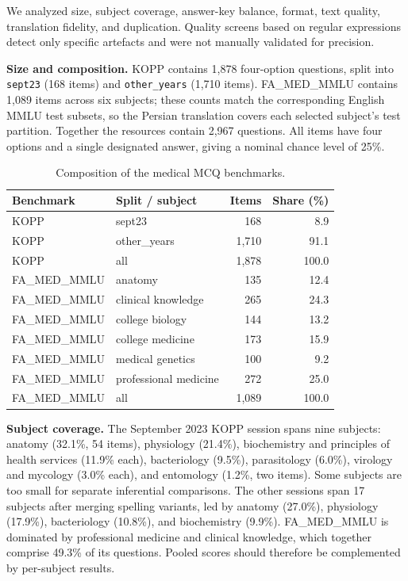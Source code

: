 \documentclass[manuscript,screen,review]{acmart}
\begin{document}
We analyzed size, subject coverage, answer-key balance, format, text quality, translation fidelity, and duplication. Quality screens based on regular expressions detect only specific artefacts and were not manually validated for precision.

\textbf{Size and composition.} KOPP contains 1,878 four-option questions, split into \texttt{sept23} (168 items) and \texttt{other\_years} (1,710 items). FA\_MED\_MMLU contains 1,089 items across six subjects; these counts match the corresponding English MMLU test subsets, so the Persian translation covers each selected subject's test partition. Together the resources contain 2,967 questions. All items have four options and a single designated answer, giving a nominal chance level of 25\%.

\begin{table}[ht]
\caption{Composition of the medical MCQ benchmarks.}\label{tab:mcq_composition}
\small
\begin{tabular}{@{}llrr@{}}
\toprule
Benchmark & Split / subject & Items & Share (\%) \\
\midrule
KOPP & sept23 & 168 & 8.9 \\
KOPP & other\_years & 1,710 & 91.1 \\
KOPP & all & 1,878 & 100.0 \\
\midrule
FA\_MED\_MMLU & anatomy & 135 & 12.4 \\
FA\_MED\_MMLU & clinical knowledge & 265 & 24.3 \\
FA\_MED\_MMLU & college biology & 144 & 13.2 \\
FA\_MED\_MMLU & college medicine & 173 & 15.9 \\
FA\_MED\_MMLU & medical genetics & 100 & 9.2 \\
FA\_MED\_MMLU & professional medicine & 272 & 25.0 \\
FA\_MED\_MMLU & all & 1,089 & 100.0 \\
\bottomrule
\end{tabular}
\end{table}

\textbf{Subject coverage.} The September 2023 KOPP session spans nine subjects: anatomy (32.1\%, 54 items), physiology (21.4\%), biochemistry and principles of health services (11.9\% each), bacteriology (9.5\%), parasitology (6.0\%), virology and mycology (3.0\% each), and entomology (1.2\%, two items). Some subjects are too small for separate inferential comparisons. The other sessions span 17 subjects after merging spelling variants, led by anatomy (27.0\%), physiology (17.9\%), bacteriology (10.8\%), and biochemistry (9.9\%). FA\_MED\_MMLU is dominated by professional medicine and clinical knowledge, which together comprise 49.3\% of its questions. Pooled scores should therefore be complemented by per-subject results.
\end{document}
